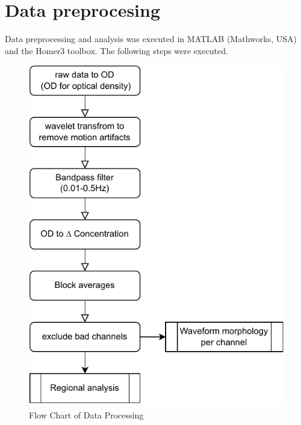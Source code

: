 \section {Data preprocesing}
Data preprocessing and analysis was executed in MATLAB (Mathworks, USA) and the Homer3 toolbox. The following steps were executed.

\begin{figure}[H]
  \centering
    \includegraphics[scale=.9]{pdf/flowchart2.pdf}
  \caption{Flow Chart of Data Processing}
  \label{fig:somesignal}
\end{figure}


